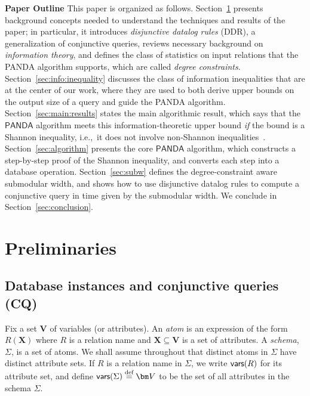 \documentclass[10pt,a4paper]{article}
\newcommand{\defeq}{\stackrel{\text{def}}{=}}
\newcommand{\vars}{\text{\sf vars}}
\newcommand{\panda}{\textsf{PANDA}\xspace}
\begin{document}
{\bf Paper Outline} This paper is organized as follows. Section~\ref{sec:prelim} presents
background concepts needed to understand the techniques and results of the paper; in
particular, it introduces {\em disjunctive datalog rules} (DDR), a generalization of
conjunctive queries, reviews necessary background on {\em information theory},  and defines
the class of statistics on input relations that the \panda algorithm supports, which are
called {\em degree constraints}. Section~\ref{sec:info:inequality} discusses the class of
information inequalities that are at the center of our work, where they are used to
both derive upper bounds on the output size of a query and guide the \panda algorithm.
Section~\ref{sec:main:results} states the main algorithmic result, which says that the
$\panda$ algorithm meets this information-theoretic upper bound {\em if} the bound is a
Shannon inequality, i.e.,~it does not involve non-Shannon
inequalities~\cite{DBLP:journals/tit/ZhangY97,zhang1998characterization}.
Section~\ref{sec:algorithm} presents the core $\panda$ algorithm, which constructs a
step-by-step proof of the Shannon inequality, and converts each step into a database
operation. Section~\ref{sec:subw} defines the degree-constraint aware submodular width, and
shows how to use disjunctive datalog rules to compute a conjunctive query in time given by
the submodular width.  We conclude in Section~\ref{sec:conclusion}.


\section{Preliminaries}
\label{sec:prelim}

\subsection{Database instances and conjunctive queries (CQ)}
\label{subsec:conjunctive}

Fix a set $\bm V$ of variables (or attributes).  An {\em atom} is an expression of the form
$R(\bm X)$ where $R$ is a relation name and $\bm X \subseteq \bm V$ is a set of attributes.
A {\em schema}, $\Sigma$, is a set of atoms.  We shall assume throughout that distinct atoms
in $\Sigma$ have distinct attribute sets. If $R$ is a relation name in $\Sigma$, we write
$\vars(R)$ for its attribute set, and define $\vars(\Sigma)\defeq \bm V$ to be the
set of all attributes in the schema $\Sigma$.
\end{document}
